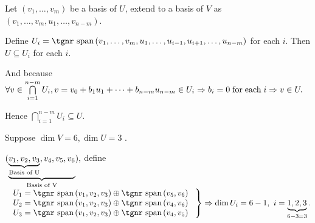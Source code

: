\documentclass[a4paper, 11pt, UTF8]{article}
\def\Spn{{\textup{\tgnr span}}\,}
\begin{document}
\begin{large}
\par\quad
Let $(v_1,\dots,v_m)$ be a basis of $U$, extend to a basis of $V$ as $(v_1,\dots,v_m,u_1,\dots,v_{n-m})$.\par\quad
Define $U_i=\Spn(v_1,\dots,v_m,u_1,\dots,u_{i-1},u_{i+1},\dots,u_{n-m})$ for each $i$. Then $U\subseteq U_i$ for each $i.$\vspace{4pt}\par\quad
\vspace{2pt}And because $\forall v\in \bigcap\limits_{i=1}^{n-m}U_i,v=v_0+b_1 u_1+\dots+b_{n-m} u_{n-m}\in U_i\Rightarrow b_i=0 \textup{\;for\;each\;} i\Rightarrow v\in U.$\par\quad
\vspace{8pt}Hence $\bigcap\limits_{i=1}^{n-m}U_i\subseteq U.$\PfEnd
\Example\,\,\, {\normalsize Suppose $\dim V=6,\dim U=3$ .\par\quad
$(\underbrace{\underbrace{v_1,v_2,v_3}_{\textup{Basis of U}},v_4,v_5,v_6}_{\textup{Basis of V}}),$ define $\MathRightBrace{l}{$
$U_1=\Spn(v_1,v_2,v_3)\oplus\Spn(v_5,v_6)\\ $
$U_2=\Spn(v_1,v_2,v_3)\oplus\Spn(v_4,v_6)\\ $
$U_3=\Spn(v_1,v_2,v_3)\oplus\Spn(v_4,v_5)$
$}\Rightarrow\dim U_i=6-1,\,\,i=\underbrace{1,2,3}_{6-3=3}.$}
\PfEnd\vspace{10pt}
\SepLine


\end{large}
\end{document}
